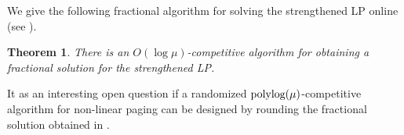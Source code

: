 \documentclass[11pt]{article}
\newtheorem{theorem}[thm]{Theorem}
\begin{document}
We give the following fractional algorithm for solving the strengthened LP online (see ). %

\begin{theorem}
	\label{thm:MU}
	There is an $O\left(\log \mu\right)$-competitive algorithm for obtaining a fractional solution for the strengthened \textnormal{LP}. %
\end{theorem}

It as an interesting open question if a randomized $\textnormal{polylog}(\mu)$-competitive algorithm for non-linear paging can be designed by rounding the fractional solution obtained in .








 

%
\end{document}
